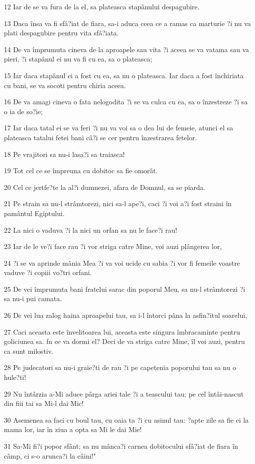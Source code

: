 \par 12 Iar de se va fura de la el, sa plateasca stapânului despagubire.
\par 13 Daca însa va fi sfâ?iat de fiara, sa-i aduca ceea ce a ramas ca marturie ?i nu va plati despagubire pentru vita sfâ?iata.
\par 14 De va împrumuta cineva de la aproapele sau vita ?i aceea se va vatama sau va pieri, ?i stapânul ei nu va fi cu ea, sa o plateasca;
\par 15 Iar daca stapânul ei a fost cu ea, sa nu o plateasca. Iar daca a fost închiriata cu bani, se va socoti pentru chiria aceea.
\par 16 De va amagi cineva o fata nelogodita ?i se va culca cu ea, sa o înzestreze ?i sa o ia de so?ie;
\par 17 Iar daca tatal ei se va feri ?i nu va voi sa o dea lui de femeie, atunci el sa plateasca tatalui fetei bani câ?i se cer pentru înzestrarea fetelor.
\par 18 Pe vrajitori sa nu-i lasa?i sa traiasca!
\par 19 Tot cel ce se împreuna cu dobitoc sa fie omorât.
\par 20 Cel ce jertfe?te la al?i dumnezei, afara de Domnul, sa se piarda.
\par 21 Pe strain sa nu-l strâmtorezi, nici sa-l ape?i, caci ?i voi a?i fost straini în pamântul Egiptului.
\par 22 La nici o vaduva ?i la nici un orfan sa nu le face?i rau!
\par 23 Iar de le ve?i face rau ?i vor striga catre Mine, voi auzi plângerea lor,
\par 24 ?i se va aprinde mânia Mea ?i va voi ucide cu sabia ?i vor fi femeile voastre vaduve ?i copiii vo?tri orfani.
\par 25 De vei împrumuta bani fratelui sarac din poporul Meu, sa nu-l strâmtorezi ?i sa nu-i pui camata.
\par 26 De vei lua zalog haina aproapelui tau, sa i-l întorci pâna la asfin?itul soarelui,
\par 27 Caci aceasta este învelitoarea lui, aceasta este singura îmbracaminte pentru goliciunea sa. fn ce va dormi el? Deci de va striga catre Mine, îl voi auzi, pentru ca sunt milostiv.
\par 28 Pe judecatori sa nu-i graie?ti de rau ?i pe capetenia poporului tau sa nu o hule?ti!
\par 29 Nu întârzia a-Mi aduce pârga ariei tale ?i a teascului tau; pe cel întâi-nascut din fiii tai sa Mi-l dai Mic!
\par 30 Asemenea sa faci cu boul tau, cu oaia ta ?i cu asinul tau: ?apte zile sa fie ei la mama lor, iar în ziua a opta sa Mi le dai Mie!
\par 31 Sa-Mi fi?i popor sfânt; sa nu mânca?i carnea dobitocului sfâ?iat de fiara în câmp, ci s-o arunca?i la câini!"

